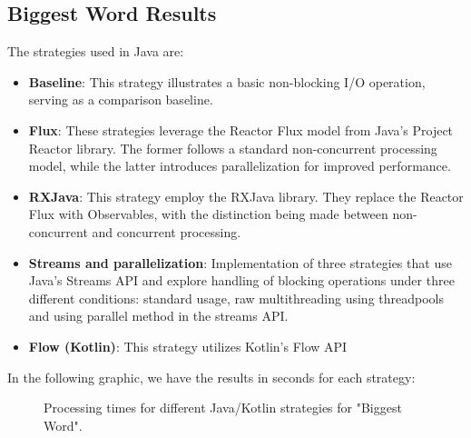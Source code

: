 \subsection{Biggest Word Results}
\label{subsubsec:biggest_word_results}

The strategies used in Java are:
\begin{itemize}
    \item \textbf{Baseline}: This strategy illustrates a basic non-blocking I/O operation, serving as a comparison baseline.
    \item \textbf{Flux}: These strategies leverage the Reactor Flux model from Java's Project Reactor library. The former follows a standard non-concurrent processing model, while the latter introduces parallelization for improved performance.
    \item \textbf{RXJava}: This strategy employ the RXJava library. They replace the Reactor Flux with Observables, with the distinction being made between non-concurrent and concurrent processing.
    \item \textbf{Streams and parallelization}: Implementation of three strategies that use Java's Streams API and explore handling of blocking operations under three different conditions: standard usage, raw multithreading using threadpools and using parallel method in the streams API.
    \item \textbf{Flow (Kotlin)}: This strategy utilizes Kotlin's Flow API
\end{itemize}

In the following graphic, we have the results in seconds for each strategy:
\begin{figure}[H]
    \centering
    \caption{Processing times for different Java/Kotlin strategies for "Biggest Word".}
    \label{fig:biggest_word_processing_times_java}
\end{figure}
    
